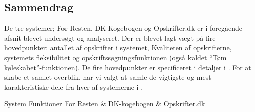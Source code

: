 \subsection{Sammendrag}
\label{subsec:eksisterende.sammendrag}

De tre systemer; For Resten, DK-Kogebogen og Opskrifter.dk er i foregående afsnit blevet undersøgt og analyseret. Der er blevet lagt vægt på fire hovedpunkter: antallet af opskrifter i systemet, Kvaliteten af opskrifterne, systemets fleksibilitet og opskriftssøgningsfunktionen (også kaldet ``Tøm køleskabet''-funktionen). De fire hovedpunkter er specificeret i detaljer i . For at skabe et samlet overblik, har vi valgt at samle de vigtigste og mest karakteristiske dele fra hver af systemerne i .

                                            {System}
       { Funktioner                }{ For Resten   & DK-kogebogen   & Opskrifter.dk }{
}


